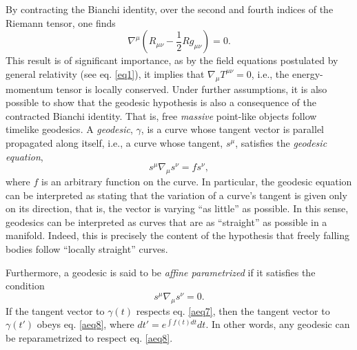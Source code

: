 \documentclass[
12pt,		%
openright,	%
twoside,  %
a4paper,			%
chapter=TITLE,		%
english,			%
french,				%
spanish,			%
brazil				%
]{USPSC-classe/USPSC}
\begin{document}
\begin{apendicesenv}
By contracting the Bianchi identity, over the second and fourth indices of the Riemann tensor, one finds 
\begin{equation}
    \nabla^{\mu}\left(R_{\mu\nu}-\frac{1}{2}Rg_{\mu\nu}\right)=0.
\end{equation}
This result is of significant importance, as by the field equations postulated by general relativity (see eq. \ref{eq1}), it implies that $\nabla_{\mu}T^{\mu\nu}=0$, i.e., the energy-momentum tensor is locally conserved. Under further assumptions, it is also possible to show \cite{Geroch1975} that the geodesic hypothesis is also a consequence of the contracted Bianchi identity. That is, free \textit{massive} point-like objects follow timelike geodesics. A \textit{geodesic}, $\gamma$, is a curve whose tangent vector is parallel propagated along itself, i.e., a curve whose tangent, $s^{\mu}$, satisfies the \textit{geodesic equation},
\begin{equation}\label{aeq7}
    s^{\mu}\nabla_{\mu}s^{\nu}=f s^{\nu},
\end{equation}
where $f$ is an arbitrary function on the curve. In particular, the geodesic equation can be interpreted as stating that the variation of a curve's tangent is given only on its direction, that is, the vector is varying ``as little'' as possible. In this sense, geodesics can be interpreted as curves that are as ``straight'' as possible in a manifold. Indeed, this is precisely the content of the hypothesis that freely falling bodies follow ``locally straight'' curves.

Furthermore, a geodesic is said to be \textit{affine parametrized} if it satisfies the condition 
\begin{equation}\label{aeq8}
    s^{\mu}\nabla_{\mu}s^{\nu}=0.
\end{equation}
If the tangent vector to $\gamma(t)$ respects eq. \ref{aeq7}, then the tangent vector to $\gamma(t')$ obeys eq. \ref{aeq8}, where $dt'=e^{\int f(t)dt}dt$. In other words, any geodesic can be reparametrized to respect eq. \ref{aeq8}.


\end{apendicesenv}
\end{document}
